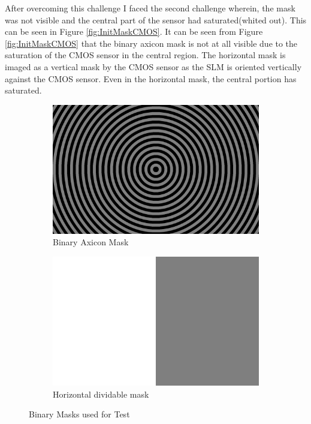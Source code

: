 After overcoming this challenge I faced the second challenge wherein, the mask was not visible and the central part of the sensor had saturated(whited out). This can be seen in Figure \ref{fig:InitMaskCMOS}. It can be seen from Figure \ref{fig:InitMaskCMOS} that the binary axicon mask is not at all visible due to the saturation of the CMOS sensor in the central region. The horizontal mask is imaged as a vertical mask by the CMOS sensor as the SLM is oriented vertically against the CMOS sensor. Even in the horizontal mask, the central portion has saturated. 

\begin{figure}[h]
    \centering
    \begin{subfigure}{0.5\textwidth}
    \centering
        \includegraphics[width=0.5\linewidth]{pics/slm/binaryaxicon.png}
        \caption{Binary Axicon Mask}
        \label{fig:axiconmask}
    \end{subfigure}%
    \begin{subfigure}{0.5\textwidth}
    \centering
        \includegraphics[width=0.5\linewidth]{pics/slm/hor-div.png}
        \caption{Horizontal dividable mask}
        \label{fig:hordivmask}
    \end{subfigure}
    \caption{Binary Masks used for Test}
    \label{fig:InitMask}
    \end{figure}
    
